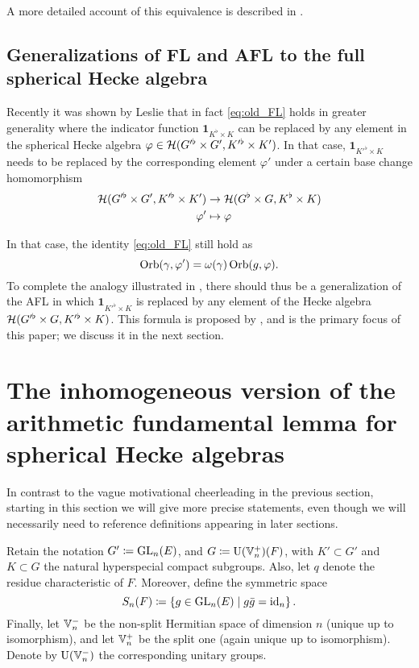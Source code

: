 A more detailed account of this equivalence is described in \cite[\S1.4]{ref:liuFJ}.

\subsection{Generalizations of FL and AFL to the full spherical Hecke algebra}
Recently it was shown by Leslie \cite{ref:leslie} that in fact
\eqref{eq:old_FL} holds in greater generality where the indicator function
$\mathbf{1}_{K^\flat \times K}$ can be replaced by any element in the spherical
Hecke algebra $\varphi \in \mathcal H(G'^\flat \times G', K'^\flat \times K')$.
In that case, $\mathbf{1}_{K'^\flat \times K}$ needs to be replaced
by the corresponding element $\varphi'$ under a certain base change homomorphism
\begin{align*}
  \mathcal H(G'^\flat \times G', K'^\flat \times K') &\to \mathcal H(G^\flat \times G, K^\flat \times K) \\
  \varphi' &\mapsto \varphi
\end{align*}

In that case, the identity \eqref{eq:old_FL} still hold as
\begin{equation}
  \operatorname{Orb}(\gamma, \varphi') = \omega(\gamma) \operatorname{Orb}(g, \varphi).
  \label{eq:eq:leslie_FL}
\end{equation}
To complete the analogy illustrated in ,
there should thus be a generalization of the AFL in which
$\mathbf{1}_{K'^\flat \times K}$ is replaced by any element of the Hecke algebra
$\mathcal H(G'^\flat \times G, K'^\flat \times K)$.
This formula is proposed by \cite{ref:AFLspherical},
and is the primary focus of this paper; we discuss it in the next section.

\section{The inhomogeneous version of the arithmetic fundamental lemma for spherical Hecke algebras}
In contrast to the vague motivational cheerleading in the previous section,
starting in this section we will give more precise statements,
even though we will necessarily need to reference definitions appearing in later sections.

Retain the notation $G' \coloneqq \operatorname{GL}_n(E)$, and $G \coloneqq \operatorname{U}(\mathbb V_n^+)(F)$,
with $K' \subset G'$ and $K \subset G$ the natural hyperspecial compact subgroups.
Also, let $q$ denote the residue characteristic of $F$.
Moreover, define the symmetric space
\[ S_n(F) \coloneqq \left\{ g \in \operatorname{GL}_n(E) \mid g \bar{g} = \operatorname{id}_n \right\}. \]
Finally, let $\mathbb V_n^-$ be the non-split Hermitian space of dimension $n$
(unique up to isomorphism),
and let $\mathbb V_n^+$ be the split one (again unique up to isomorphism).
Denote by $\operatorname{U}(\mathbb V_n^-)$ the corresponding unitary groups.

